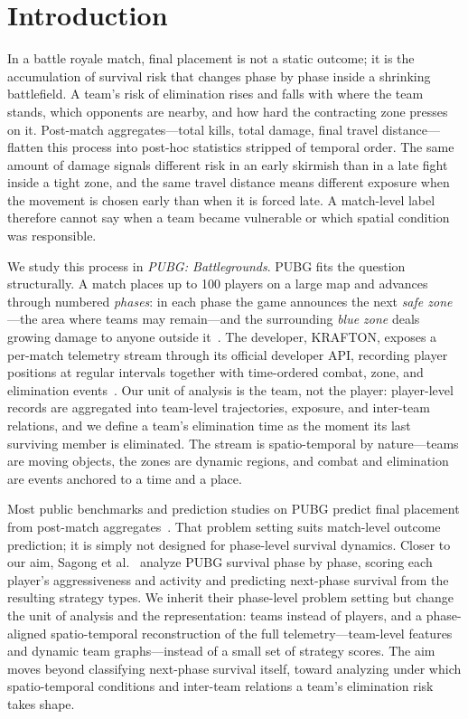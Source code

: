 \section{Introduction}

In a battle royale match, final placement is not a static outcome; it is the
accumulation of survival risk that changes phase by phase inside a shrinking
battlefield. A team's risk of elimination rises and falls with where the
team stands, which opponents are nearby, and how hard the contracting zone
presses on it. Post-match aggregates---total kills, total damage, final
travel distance---flatten this process into post-hoc statistics stripped of
temporal order. The same amount of damage signals different risk in an early
skirmish than in a late fight inside a tight zone, and the same travel
distance means different exposure when the movement is chosen early than
when it is forced late. A match-level label therefore cannot say when a team
became vulnerable or which spatial condition was responsible.

We study this process in \textit{PUBG: Battlegrounds}. PUBG fits the
question structurally. A match places up to 100 players on a large map and
advances through numbered \textit{phases}: in each phase the game announces
the next \textit{safe zone}---the area where teams may remain---and the
surrounding \textit{blue zone} deals growing damage to anyone outside
it~\cite{pubgGameInfo}. The developer, KRAFTON, exposes a per-match
telemetry stream through its official developer API, recording player
positions at regular intervals together with time-ordered combat, zone, and
elimination events~\cite{pubgTelemetryEvents}. Our unit of analysis is the
team, not the player: player-level records are aggregated into team-level
trajectories, exposure, and inter-team relations, and we define a team's
elimination time as the moment its last surviving member is eliminated. The
stream is spatio-temporal by nature---teams are moving objects, the zones
are dynamic regions, and combat and elimination are events anchored to a
time and a place.

Most public benchmarks and prediction studies on PUBG predict final
placement from post-match aggregates~\cite{kagglePubgFinishPlacement,sen2021pubgFinalRank,lee2025pubgRank}.
That problem setting suits match-level outcome prediction; it is simply not
designed for phase-level survival dynamics. Closer to our aim, Sagong et
al.~\cite{sagong2025hunterCamper} analyze PUBG survival phase by phase,
scoring each player's aggressiveness and activity and predicting next-phase
survival from the resulting strategy types. We inherit their phase-level
problem setting but change the unit of analysis and the representation:
teams instead of players, and a phase-aligned spatio-temporal reconstruction
of the full telemetry---team-level features and dynamic team graphs---instead
of a small set of strategy scores. The aim moves beyond classifying
next-phase survival itself, toward analyzing under which spatio-temporal
conditions and inter-team relations a team's elimination risk takes shape.

